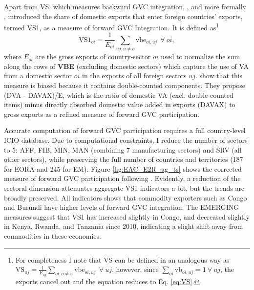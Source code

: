 \documentclass[a4paper]{article}
\begin{document}
Apart from VS, which measures backward GVC integration, \citet{hummels2001nature}, and more formally \citet{daudin2011produces}, introduced the share of domestic exports that enter foreign countries' exports, termed VS1, as a measure of forward GVC Integration. It is defined as\footnote{For completeness I note that VS can be defined in an analogous way as $\text{VS}_{uj} = \frac{1}{E_{uj}} \sum_{oi, o \neq  u} \text{vbe}_{oi, uj}\ \ \forall\ uj$, however, since $\sum_{oi} \text{vb}_{oi, uj} = 1\ \forall\ uj$, the exports cancel out and the equation reduces to Eq. \ref{eq:VS}. \vspace{-6mm}}
\begin{equation} \label{eq:VS1}
\text{VS1}_{oi} = \frac{1}{E_{oi}} \sum_{uj, u \neq  o} \text{vbe}_{oi, uj}\ \ \forall\ oi,
\end{equation}
\noindent where $E_{oi}$ are the gross exports of country-sector $oi$ used to normalize the sum along the rows of \textbf{VBE} (excluding domestic sectors) which capture the use of VA from a domestic sector $oi$ in the exports of all foreign sectors $uj$. \citet{borin2019measuring} show that this measure is biased because it contains double-counted components. They propose (DVA - DAVAX)/E, which is the ratio of domestic VA (excl. double counted items) minus directly absorbed domestic value added in exports (DAVAX) to gross exports as a refined measure of forward GVC participation. \newline 

Accurate computation of forward GVC participation requires a full country-level ICIO database. Due to computational constraints, I reduce the number of sectors to 5: AFF, FIB, MIN, MAN (combining 7 manufacturing sectors) and SRV (all other sectors), while preserving the full number of countries and territories (187 for EORA and 245 for EM). Figure \ref{fig:EAC_E2R_ag_ts} shows the corrected measure of forward GVC participation following \citet{borin2019measuring}. Evidently, a reduction of the sectoral dimension attenuates aggregate VS1 indicators a bit, but the trends are broadly preserved.  
All indicators shows that commodity exporters such as Congo and Burundi have higher levels of forward GVC integration. The EMERGING measures suggest that VS1 has increased slightly in Congo, and decreased slightly in Kenya, Rwanda, and Tanzania since 2010, indicating a slight shift away from commodities in these economies. 
\end{document}
